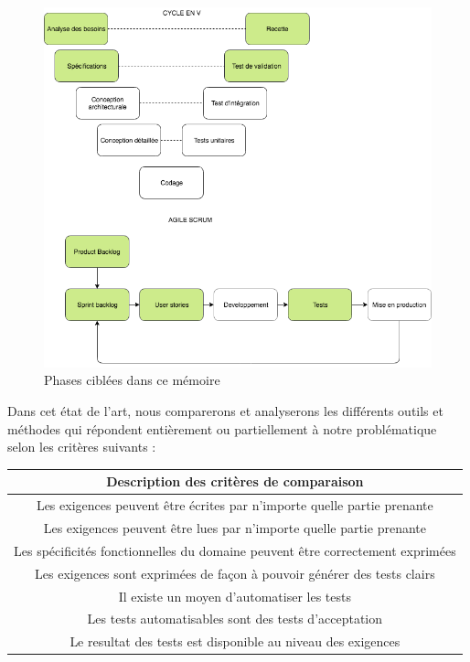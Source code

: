 \begin{figure}[H]
    \centering
    \includegraphics[width=\textwidth]{images/cycles.png}
    \caption{Phases ciblées dans ce mémoire}
    \label{fig:cylce}
\end{figure}

Dans cet état de l'art, nous comparerons et analyserons les différents outils et méthodes qui répondent entièrement ou partiellement à notre problématique selon les critères suivants :

\begin{center}
 \begin{tabular}{||c||} 
 \hline
Description des critères de comparaison \\ [0.5ex] 
 \hline\hline
Les exigences peuvent être écrites par n’importe quelle partie prenante \\ 
 \hline
Les exigences peuvent être lues par n’importe quelle partie prenante\\
 \hline
Les spécificités fonctionnelles du domaine peuvent être correctement exprimées \\
 \hline
Les exigences sont exprimées de façon à pouvoir générer des tests clairs \\
 \hline
Il existe un moyen d’automatiser les tests\\ 
 \hline
 Les tests automatisables sont des tests d’acceptation\\ 
\hline 
 Le resultat des tests est disponible au niveau des exigences\\ [1ex]
\hline 
\end{tabular}
\end{center}

